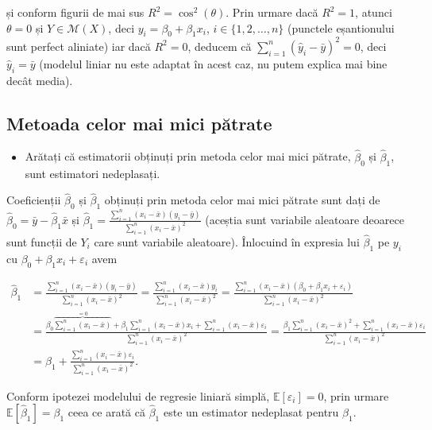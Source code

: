 \documentclass[]{article}
\newenvironment{frshaded*}{%
  \def\FrameCommand{\fboxrule=\FrameRule\fboxsep=\FrameSep \fcolorbox{framecolor}{shadecolor1}}%
  \MakeFramed {\advance\hsize-\width \FrameRestore}}%
{\endMakeFramed}
\newenvironment{rmdblock}[1]
  {\begin{frshaded*}
  \begin{itemize}
  \renewcommand{\labelitemi}{
    \raisebox{-.7\height}[0pt][0pt]{
      {\setkeys{Gin}{width=2em,keepaspectratio}\texttt{[image: images/icons/\#1]}}
    }
  }
  \item
  }
  {
  \end{itemize}
  \end{frshaded*}
  }
\newenvironment{rmdexercise}
  {\begin{rmdblock}{exercise}}
  {\end{rmdblock}}
\begin{document}
și conform figurii de mai sus \(R^2 = \cos^2(\theta)\). Prin urmare dacă
\(R^2 = 1\), atunci \(\theta = 0\) și \(Y\in\mathcal{M}(X)\), deci
\(y_i = \beta_0 + \beta_1 x_i\), \(i\in\{1,2,\ldots,n\}\) (punctele
eșantionului sunt perfect aliniate) iar dacă \(R^2 = 0\), deducem că
\(\sum_{i = 1}^{n}(\hat y_i - \bar y)^2 = 0\), deci
\(\hat y_i = \bar y\) (modelul liniar nu este adaptat în acest caz, nu
putem explica mai bine decât media).

\subsection{Metoada celor mai mici
pătrate}\label{metoada-celor-mai-mici-patrate}

\begin{rmdexercise}
Arătați că estimatorii obținuți prin metoda celor mai mici pătrate,
\(\hat\beta_0\) și \(\hat\beta_1\), sunt estimatori nedeplasați.
\end{rmdexercise}

Coeficienții \(\hat\beta_0\) și \(\hat\beta_1\) obținuți prin metoda
celor mai mici pătrate sunt dați de
\(\hat\beta_0 = \bar y - \hat\beta_1 \bar x\) și
\(\hat\beta_1 = \frac{\sum_{i = 1}^{n}(x_i - \bar x)(y_i - \bar y)}{\sum_{i = 1}^{n}(x_i - \bar x)^2}\)
(aceștia sunt variabile aleatoare deoarece sunt funcții de \(Y_i\) care
sunt variabile aleatoare). Înlocuind în expresia lui \(\hat\beta_1\) pe
\(y_i\) cu \(\beta_0+\beta_1 x_i + \varepsilon_i\) avem

\begin{align*}
\hat\beta_1 &= \frac{\sum_{i = 1}^{n}(x_i - \bar x)(y_i - \bar y)}{\sum_{i = 1}^{n}(x_i - \bar x)^2} = \frac{\sum_{i = 1}^{n}(x_i - \bar x)y_i}{\sum_{i = 1}^{n}(x_i - \bar x)^2} = \frac{\sum_{i = 1}^{n}(x_i - \bar x)(\beta_0+\beta_1 x_i + \varepsilon_i)}{\sum_{i = 1}^{n}(x_i - \bar x)^2}\\
  &= \frac{\beta_0\overbrace{\sum_{i = 1}^{n}(x_i - \bar x)}^{ = 0} + \beta_1 \sum_{i = 1}^{n}(x_i - \bar x)x_i + \sum_{i = 1}^{n}(x_i - \bar x)\varepsilon_i}{\sum_{i = 1}^{n}(x_i - \bar x)^2} = \frac{\beta_1 \sum_{i = 1}^{n}(x_i - \bar x)^2 + \sum_{i = 1}^{n}(x_i - \bar x)\varepsilon_i}{\sum_{i = 1}^{n}(x_i - \bar x)^2}\\
  &= \beta_1 + \frac{\sum_{i = 1}^{n}(x_i - \bar x)\varepsilon_i}{\sum_{i = 1}^{n}(x_i - \bar x)^2}.
\end{align*}

Conform ipotezei modelului de regresie liniară simplă,
\(\mathbb{E}[\varepsilon_i] = 0\), prin urmare
\(\mathbb{E}[\hat\beta_1] = \beta_1\) ceea ce arată că \(\hat\beta_1\)
este un estimator nedeplasat pentru \(\beta_1\).
\end{document}
